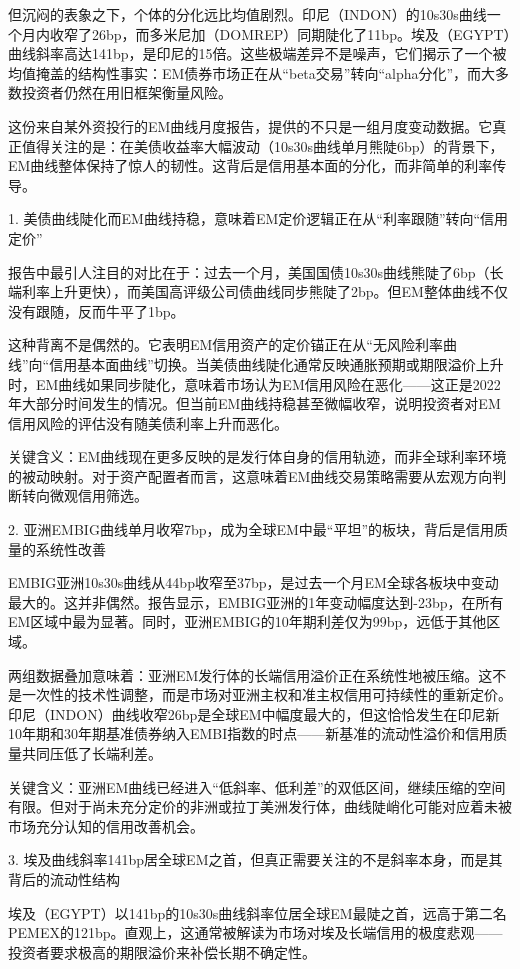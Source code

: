 \documentclass[11pt]{ctexart}
\begin{document}
但沉闷的表象之下，个体的分化远比均值剧烈。印尼（INDON）的10s30s曲线一个月内收窄了26bp，而多米尼加（DOMREP）同期陡化了11bp。埃及（EGYPT）曲线斜率高达141bp，是印尼的15倍。这些极端差异不是噪声，它们揭示了一个被均值掩盖的结构性事实：EM债券市场正在从“beta交易”转向“alpha分化”，而大多数投资者仍然在用旧框架衡量风险。

这份来自某外资投行的EM曲线月度报告，提供的不只是一组月度变动数据。它真正值得关注的是：在美债收益率大幅波动（10s30s曲线单月熊陡6bp）的背景下，EM曲线整体保持了惊人的韧性。这背后是信用基本面的分化，而非简单的利率传导。

1. 美债曲线陡化而EM曲线持稳，意味着EM定价逻辑正在从“利率跟随”转向“信用定价”

报告中最引人注目的对比在于：过去一个月，美国国债10s30s曲线熊陡了6bp（长端利率上升更快），而美国高评级公司债曲线同步熊陡了2bp。但EM整体曲线不仅没有跟随，反而牛平了1bp。

这种背离不是偶然的。它表明EM信用资产的定价锚正在从“无风险利率曲线”向“信用基本面曲线”切换。当美债曲线陡化通常反映通胀预期或期限溢价上升时，EM曲线如果同步陡化，意味着市场认为EM信用风险在恶化——这正是2022年大部分时间发生的情况。但当前EM曲线持稳甚至微幅收窄，说明投资者对EM信用风险的评估没有随美债利率上升而恶化。

关键含义：EM曲线现在更多反映的是发行体自身的信用轨迹，而非全球利率环境的被动映射。对于资产配置者而言，这意味着EM曲线交易策略需要从宏观方向判断转向微观信用筛选。

2. 亚洲EMBIG曲线单月收窄7bp，成为全球EM中最“平坦”的板块，背后是信用质量的系统性改善

EMBIG亚洲10s30s曲线从44bp收窄至37bp，是过去一个月EM全球各板块中变动最大的。这并非偶然。报告显示，EMBIG亚洲的1年变动幅度达到-23bp，在所有EM区域中最为显著。同时，亚洲EMBIG的10年期利差仅为99bp，远低于其他区域。

两组数据叠加意味着：亚洲EM发行体的长端信用溢价正在系统性地被压缩。这不是一次性的技术性调整，而是市场对亚洲主权和准主权信用可持续性的重新定价。印尼（INDON）曲线收窄26bp是全球EM中幅度最大的，但这恰恰发生在印尼新10年期和30年期基准债券纳入EMBI指数的时点——新基准的流动性溢价和信用质量共同压低了长端利差。

关键含义：亚洲EM曲线已经进入“低斜率、低利差”的双低区间，继续压缩的空间有限。但对于尚未充分定价的非洲或拉丁美洲发行体，曲线陡峭化可能对应着未被市场充分认知的信用改善机会。

3. 埃及曲线斜率141bp居全球EM之首，但真正需要关注的不是斜率本身，而是其背后的流动性结构

埃及（EGYPT）以141bp的10s30s曲线斜率位居全球EM最陡之首，远高于第二名PEMEX的121bp。直观上，这通常被解读为市场对埃及长端信用的极度悲观——投资者要求极高的期限溢价来补偿长期不确定性。
\end{document}
